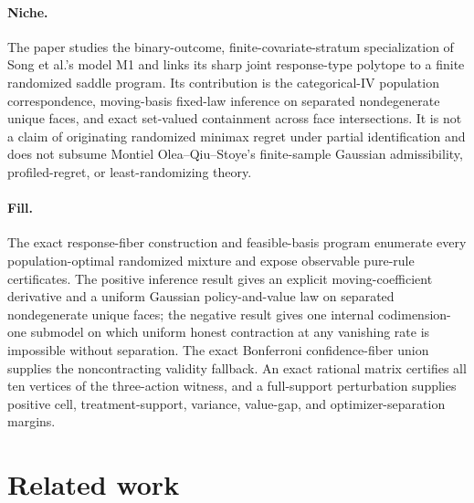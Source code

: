 \documentclass{article}
\begin{document}
\paragraph{Niche.} The paper studies the binary-outcome, finite-covariate-stratum specialization of Song et al.'s model M1 and links its sharp joint response-type polytope to a finite randomized saddle program.  Its contribution is the categorical-IV population correspondence, moving-basis fixed-law inference on separated nondegenerate unique faces, and exact set-valued containment across face intersections.  It is not a claim of originating randomized minimax regret under partial identification and does not subsume Montiel Olea--Qiu--Stoye's finite-sample Gaussian admissibility, profiled-regret, or least-randomizing theory.

\paragraph{Fill.} The exact response-fiber construction and feasible-basis program enumerate every population-optimal randomized mixture and expose observable pure-rule certificates.  The positive inference result gives an explicit moving-coefficient derivative and a uniform Gaussian policy-and-value law on separated nondegenerate unique faces; the negative result gives one internal codimension-one submodel on which uniform honest contraction at any vanishing rate is impossible without separation.  The exact Bonferroni confidence-fiber union supplies the noncontracting validity fallback.  An exact rational matrix certifies all ten vertices of the three-action witness, and a full-support perturbation supplies positive cell, treatment-support, variance, value-gap, and optimizer-separation margins.

\section{Related work}
\end{document}
